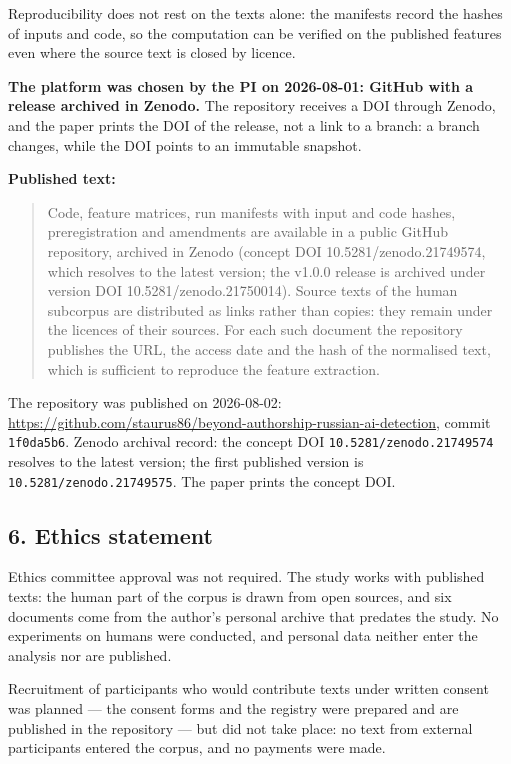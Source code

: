 \documentclass[11pt,a4paper]{article}
\renewcommand{\_}{\textunderscore\allowbreak}
\begin{document}
Reproducibility does not rest on the texts alone: the manifests record the hashes of
inputs and code, so the computation can be verified on the published features even
where the source text is closed by licence.

\textbf{The platform was chosen by the PI on 2026-08-01: GitHub with a release archived in
Zenodo.} The repository receives a DOI through Zenodo, and the paper prints the DOI
of the release, not a link to a branch: a branch changes, while the DOI points to an
immutable snapshot.

\textbf{Published text:}

\begin{quote}
Code, feature matrices, run manifests with input and code hashes, preregistration
and amendments are available in a public GitHub repository, archived in Zenodo
(concept DOI 10.5281/zenodo.21749574, which resolves to the latest version;
the v1.0.0 release is archived under version DOI 10.5281/zenodo.21750014).
Source texts of the
human subcorpus are distributed as links rather than copies: they remain under the
licences of their sources. For each such document the repository publishes the
URL, the access date and the hash of the normalised text, which is sufficient to
reproduce the feature extraction.
\end{quote}

The repository was published on 2026-08-02:
\url{https://github.com/staurus86/beyond-authorship-russian-ai-detection}, commit
\texttt{1f0da5b6}. Zenodo archival record: the concept DOI \texttt{10.5281/zenodo.21749574} resolves
to the latest version; the first published version is \texttt{10.5281/zenodo.21749575}. The
paper prints the concept DOI.

\subsection{6. Ethics statement}

Ethics committee approval was not required. The study works with published
texts: the human part of the corpus is drawn from open sources, and six
documents come from the author's personal archive that predates the study. No
experiments on humans were conducted, and personal data neither enter the
analysis nor are published.

Recruitment of participants who would contribute texts under written consent
was planned — the consent forms and the registry were prepared and are
published in the repository — but did not take place: no text from external
participants entered the corpus, and no payments were made.
\end{document}
